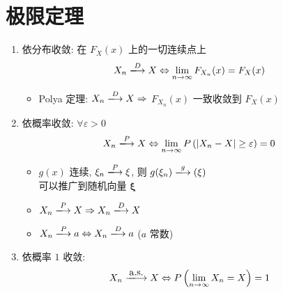 \documentclass[11pt,a4paper,twocolumn]{article} %
\numberwithin{equation}{section} %
\renewcommand*{\vec}[1]{\bm{#1}} %
\begin{document}
\section{极限定理} %
\label{sec:limit}
\begin{enumerate}
	\item 依分布收敛: 在 $F_X(x)$ 上的一切连续点上
	\begin{equation}
		X_n\xlongrightarrow{D} X \Leftrightarrow 
		\lim_{n\to\infty}F_{X_n}(x) = F_X(x)
	\end{equation}
	\begin{itemize}
		\item Polya 定理: $X_n\xlongrightarrow{D} X \Rightarrow$ $F_{X_n}(x)$ 一致收敛到
		$F_X(x)$ 
	\end{itemize}
	\item 依概率收敛: $\forall \varepsilon > 0$
	\begin{equation}
		X_n\xlongrightarrow{P} X \Leftrightarrow
		\lim_{n\to\infty} P\left(|X_n - X|\ge\varepsilon\right) = 0
	\end{equation}
	\begin{itemize}
		\item $g(x)$ 连续, $\xi_n\xlongrightarrow{P}\xi$, 则
		$g(\xi_n)\xlongrightarrow g(\xi)$\\
		可以推广到随机向量 $\vec\xi$
		\item $X_n\xlongrightarrow{P} X \Rightarrow X_n\xlongrightarrow{D} X$
		\item $X_n\xlongrightarrow{P} a \Leftrightarrow 
		X_n\xlongrightarrow{D} a$ ($a$ 常数)
	\end{itemize}
	\item 依概率 $1$ 收敛: 
	\begin{equation}
		X_n\xlongrightarrow{\mbox{a.s.}} X \Leftrightarrow 
		P\left(\lim_{n\to\infty} X_n = X\right) = 1
	\end{equation}
\end{enumerate}
\end{document}
